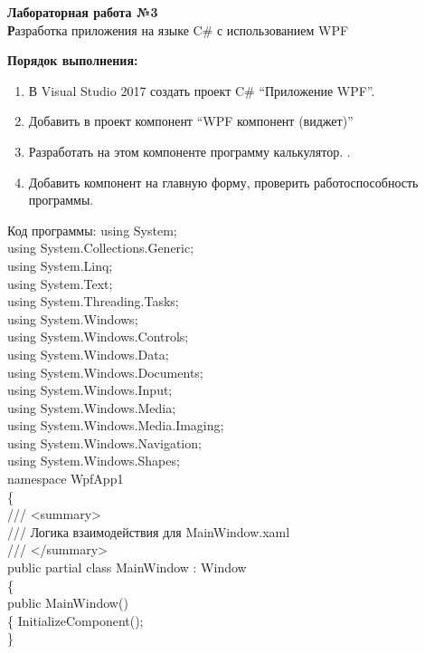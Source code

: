 \begin{center}
\textbf{Лабораторная работа №3}
\\
\textbf Разработка приложения на языке C\# с использованием WPF
\\
\end{center}
\textbf{Порядок выполнения:} 
\begin{enumerate}
\item В Visual Studio 2017 создать проект C\# “Приложение WPF”.
\item Добавить в проект компонент “WPF компонент (виджет)”
\item Разработать на этом компоненте программу калькулятор. .
\item Добавить компонент на главную форму, проверить работоспособность программы.
\\
\end{enumerate}
\newpage
Код программы:
using System;\\
using System.Collections.Generic;\\
using System.Linq;\\
using System.Text;\\
using System.Threading.Tasks;\\
using System.Windows;\\
using System.Windows.Controls;\\
using System.Windows.Data;\\
using System.Windows.Documents;\\
using System.Windows.Input;\\
using System.Windows.Media;\\
using System.Windows.Media.Imaging;\\
using System.Windows.Navigation;\\
using System.Windows.Shapes;\\

namespace WpfApp1\\
\{\\
    /// <summary>\\
    /// Логика взаимодействия для MainWindow.xaml\\
    /// </summary>\\
    public partial class MainWindow : Window\\
    \{\\
        public MainWindow()\\
        \{
            InitializeComponent();\\
        \}

